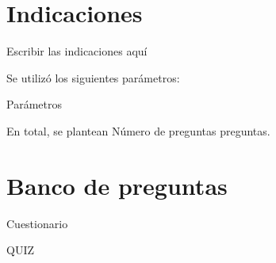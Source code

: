 \documentclass[a4,11pt]{aleph-notas}
\begin{document}
\encabezado

\section{Indicaciones}

Escribir las indicaciones aquí



Se utilizó los siguientes parámetros:
\begin{itemize}
{{Parámetros}}
\end{itemize}
En total, se plantean {{Número de preguntas}} preguntas.


\section{Banco de preguntas}

\begin{quiz}{{{Cuestionario}}}

{{QUIZ}}


\end{quiz}
\end{document}
